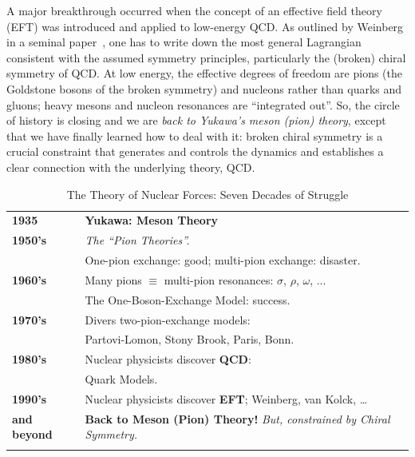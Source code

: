 \documentclass[sort&compress,preprint,3p]{elsarticle}
\begin{document}
A major breakthrough occurred when 
the concept of an effective field theory (EFT) was introduced
and applied to low-energy QCD.
As outlined by Weinberg in a seminal paper~\cite{Wei79},
one has to write down the most general Lagrangian consistent
with the assumed symmetry principles, particularly
the (broken) chiral symmetry of QCD. At low energy, the effective degrees of freedom are pions 
(the Goldstone bosons of the broken symmetry) and
nucleons rather than quarks and gluons; heavy mesons and
nucleon resonances are ``integrated out''.
So, the circle of history is closing and we are {\it back to Yukawa's meson (pion) theory},
except that we have finally learned how to deal with it:
broken chiral symmetry is a crucial constraint that generates
and controls the dynamics and establishes a clear connection
with the underlying theory, QCD.


\begin{table}[t]
\caption{The Theory of Nuclear Forces:
Seven Decades of Struggle
\label{tab_hist}} 
\smallskip
\begin{tabular*}{\textwidth}{@{\extracolsep{\fill}}ll}
\hline 
\hline 
\noalign{\smallskip}
\bf 1935   &
\bf Yukawa: Meson Theory
\\
\noalign{\smallskip}
\hline
\noalign{\smallskip}
\bf 1950's &            
{\it The ``Pion Theories''.}
\\
          &
One-pion exchange: good;
multi-pion exchange: disaster.
\\
\noalign{\smallskip}
\hline
\noalign{\smallskip}
\bf 1960's & 
Many pions $\equiv$ multi-pion resonances:
{\boldmath $\sigma$, $\rho$, $\omega$, ...}
\\
           & 
The One-Boson-Exchange Model: success.
\\
\noalign{\smallskip}
\hline
\noalign{\smallskip}
\bf 1970's & 
Divers two-pion-exchange models: 
\\
   &
Partovi-Lomon, Stony Brook, Paris, Bonn.
\\
\noalign{\smallskip}
\hline
\noalign{\smallskip}
\bf 1980's &  
Nuclear physicists discover {\bf QCD}:
\\
           & Quark Models.
\\
\noalign{\smallskip}
\hline
\noalign{\smallskip}
\bf 1990's & 
Nuclear physicists discover {\bf EFT}; Weinberg, van Kolck, \ldots
\\
\bf and beyond &
{\bf Back to Meson (Pion) Theory!} {\it But, constrained by Chiral Symmetry.}
\\
\noalign{\smallskip}
\hline
\hline
\end{tabular*}
\vspace*{0.5cm}
\end{table}
\end{document}
